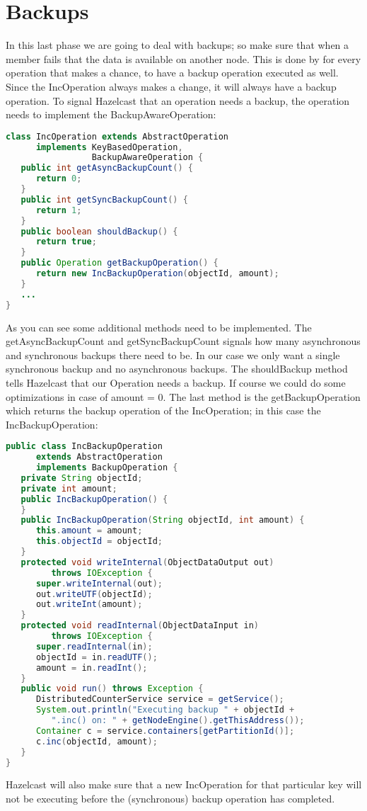 \section{Backups}
In this last phase we are going to deal with backups; so make sure that when a member fails that the data is available on another node. This is done by for every operation that makes a chance, to have a backup operation executed as well. Since the IncOperation always makes a change, it will always have a backup operation. To signal Hazelcast that an operation needs a backup, the operation needs to implement the BackupAwareOperation:
\begin{lstlisting}[language=java]
class IncOperation extends AbstractOperation 
      implements KeyBasedOperation, 
                 BackupAwareOperation {
   public int getAsyncBackupCount() {
      return 0;
   }
   public int getSyncBackupCount() {
      return 1;
   }
   public boolean shouldBackup() {
      return true;
   }
   public Operation getBackupOperation() {
      return new IncBackupOperation(objectId, amount);
   }
   ...
}
\end{lstlisting}
As you can see some additional methods need to be implemented. The getAsyncBackupCount and getSyncBackupCount signals how many asynchronous and synchronous backups there need to be. In our case we only want a single synchronous backup and no asynchronous backups. The shouldBackup method tells Hazelcast that our Operation needs a backup. If course we could do some optimizations in case of amount = 0. The last method is the getBackupOperation which returns the backup operation of the IncOperation; in this case the IncBackupOperation:

\begin{lstlisting}[language=java]
public class IncBackupOperation 
      extends AbstractOperation 
      implements BackupOperation {
   private String objectId;
   private int amount;
   public IncBackupOperation() {
   }
   public IncBackupOperation(String objectId, int amount) {
      this.amount = amount;
      this.objectId = objectId;
   }
   protected void writeInternal(ObjectDataOutput out) 
         throws IOException {
      super.writeInternal(out);
      out.writeUTF(objectId);
      out.writeInt(amount);
   }
   protected void readInternal(ObjectDataInput in) 
         throws IOException {
      super.readInternal(in);
      objectId = in.readUTF();
      amount = in.readInt();
   }
   public void run() throws Exception {
      DistributedCounterService service = getService();
      System.out.println("Executing backup " + objectId + 
         ".inc() on: " + getNodeEngine().getThisAddress());
      Container c = service.containers[getPartitionId()];
      c.inc(objectId, amount);
   }
}
\end{lstlisting}
Hazelcast will also make sure that a new IncOperation for that particular key will not be executing before the (synchronous) backup operation has completed.


